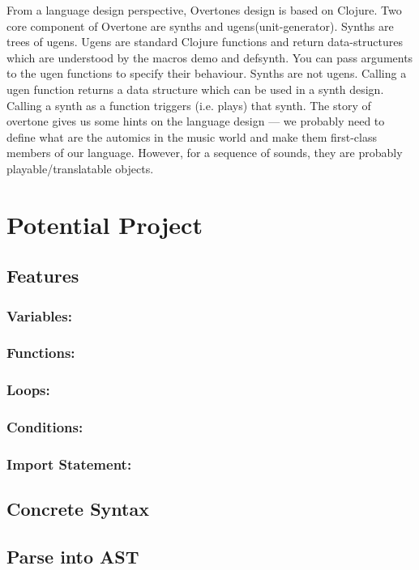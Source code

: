 From a language design perspective, Overtones design is based on Clojure. Two core component of Overtone are synths and ugens(unit-generator). Synths are trees of ugens. Ugens are standard Clojure functions and return data-structures which are understood by the macros demo and defsynth. You can pass arguments to the ugen functions to specify their behaviour. Synths are not ugens. Calling a ugen function returns a data structure which can be used in a synth design. Calling a synth as a function triggers (i.e. plays) that synth.\cite{Aaron14} The story of overtone gives us some hints on the language design --- we probably need to define what are the automics in the music world and make them first-class members of our language. However, for a sequence of sounds, they are probably playable/translatable objects.


\section{Potential Project}

\subsection{Features}
	\subsubsection{Variables:}
	\subsubsection{Functions:}
	\subsubsection{Loops:}
	\subsubsection{Conditions:}
		
	\subsubsection{Import Statement:}
\subsection{Concrete Syntax}
\subsection{Parse into AST}

